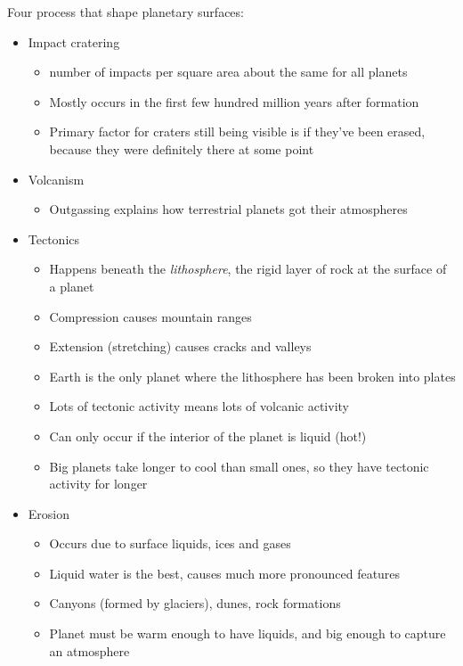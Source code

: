 Four process that shape planetary surfaces:
\begin{itemize}
\item Impact cratering
\begin{itemize}
\item number of impacts per square area about the same for all planets
\item Mostly occurs in the first few hundred million years after formation
\item Primary factor for craters still being visible is if they've been erased, because they were definitely there at some point
\end{itemize}
\item Volcanism
\begin{itemize}
\item Outgassing explains how terrestrial planets got their atmospheres
\end{itemize}
\item Tectonics
\begin{itemize}
\item Happens beneath the \emph{lithosphere}, the rigid layer of rock at the surface of a planet
\item Compression causes mountain ranges
\item Extension (stretching) causes cracks and valleys
\item Earth is the only planet where the lithosphere has been broken into plates
\item Lots of tectonic activity means lots of volcanic activity
\item Can only occur if the interior of the planet is liquid (hot!)
\item Big planets take longer to cool than small ones, so they have tectonic activity for longer
\end{itemize}
\item Erosion
\begin{itemize}
\item Occurs due to surface liquids, ices and gases
\item Liquid water is the best, causes much more pronounced features
\item Canyons (formed by glaciers), dunes, rock formations
\item Planet must be warm enough to have liquids, and big enough to capture an atmosphere
\end{itemize}
\end{itemize}
